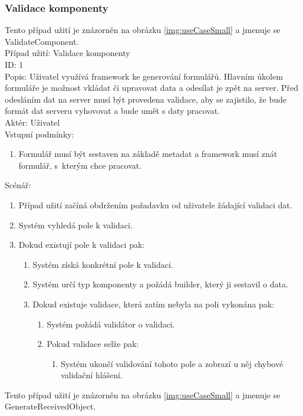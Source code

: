 \subsubsection{Validace komponenty}
Tento případ užití je znázorněn na obrázku \ref{img:useCaseSmall} a jmenuje se ValidateComponent.\\
Případ užití: Validace komponenty\\
ID: 1\\
Popis: 
Uživatel využívá framework ke generování formulářů. Hlavním úkolem formuláře je možnost vkládat či upravovat data a odesílat je zpět na server. Před odesláním dat na server musí být provedena validace, aby se zajistilo, že bude formát dat serveru vyhovovat a bude umět s daty pracovat.\\
Aktér: Uživatel\\
Vstupní podmínky:
\begin{enumerate}
\item Formulář musí být sestaven na základě metadat a framework musí znát formulář, s~kterým chce pracovat.
\end{enumerate}
Scénář:
\begin{enumerate}
\item Případ užití začíná obdržením požadavku od uživatele žádající validaci dat.
\item Systém vyhledá pole k validaci.
\item Dokud existují pole k validaci pak:
\begin{enumerate}
\item Systém získá konkrétní pole k validaci.
\item Systém určí typ komponenty a požádá builder, který ji sestavil o data.
\item Dokud existuje validace, která zatím nebyla na poli vykonána pak:
\begin{enumerate}
\item Systém požádá validátor o validaci.
\item Pokud validace selže pak:
\begin{enumerate}
\item Systém ukončí validování tohoto pole a zobrazí u něj chybové validační hlášení.
\end{enumerate}
\end{enumerate}
\end{enumerate}
\end{enumerate}
Tento případ užití je znázorněn na obrázku \ref{img:useCaseSmall} a jmenuje se GenerateReceivedObject.\\
